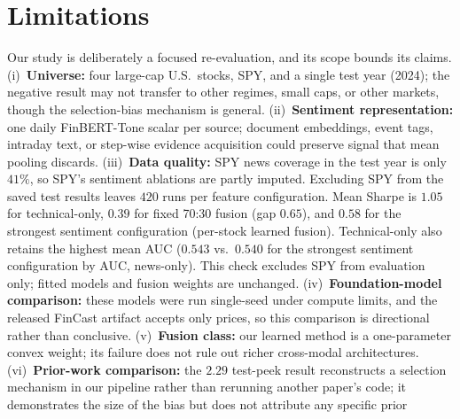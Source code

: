 \documentclass[conference]{IEEEtran}
\begin{document}
\section{Limitations}
\label{sec:limits}

Our study is deliberately a focused re-evaluation, and its scope bounds its
claims. (i)~\textbf{Universe:} four large-cap U.S.\ stocks, SPY, and a single test
year (2024); the negative result may not transfer to other regimes, small caps,
or other markets, though the selection-bias mechanism is general.
(ii)~\textbf{Sentiment representation:} one daily FinBERT-Tone scalar per
source; document embeddings, event tags, intraday text, or step-wise evidence
acquisition \cite{deng2026sea} could preserve signal that mean pooling discards.
(iii)~\textbf{Data quality:} SPY news coverage in the test year is only $41\%$,
so SPY's sentiment ablations are partly imputed. Excluding SPY from the saved
test results leaves $420$ runs per feature configuration. Mean Sharpe is
$1.05$ for technical-only, $0.39$ for fixed 70:30 fusion (gap $0.65$), and
$0.58$ for the strongest sentiment configuration (per-stock learned fusion).
Technical-only also retains the highest mean AUC ($0.543$ vs.\ $0.540$ for
the strongest sentiment configuration by AUC, news-only). This check excludes
SPY from evaluation only; fitted models and fusion weights are unchanged.
(iv)~\textbf{Foundation-model comparison:} these models
were run single-seed under compute limits, and the released FinCast artifact
accepts only prices, so this comparison is directional rather than conclusive.
(v)~\textbf{Fusion class:} our learned method is a one-parameter convex weight;
its failure does not rule out richer cross-modal architectures.
(vi)~\textbf{Prior-work comparison:} the $2.29$ test-peek result reconstructs a
selection mechanism in our pipeline rather than rerunning another paper's code;
it demonstrates the size of the bias but does not attribute any specific prior
\end{document}
